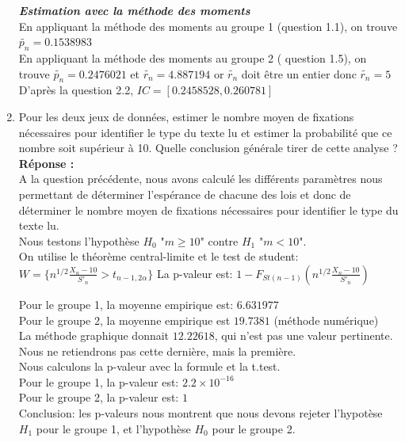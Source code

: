 \documentclass[12pt]{article}
\begin{document}
\begin{enumerate}
\textbf{\textit{Estimation avec la méthode des moments}}\\
En appliquant la méthode des moments au groupe 1 (question 1.1), on trouve $\tilde{p_n} = 0.1538983$ \\

\vspace{5mm}
En appliquant la méthode des moments au groupe 2 ( question 1.5), on trouve $\tilde{p_n} = 0.2476021 $  et $\tilde{r_n} = 4.887194$ or $\tilde{r_n}$ doit être un entier donc $\tilde{r_n} = 5$
D'après la question 2.2, $ IC = [0.2458528,0.260781]$


\item Pour les deux jeux de données, estimer le nombre moyen de fixations nécessaires pour identifier le type du texte lu et estimer la probabilité que ce nombre soit supérieur à 10. Quelle conclusion générale tirer de cette analyse ? \\
\textbf{Réponse :\\}
A la question précédente, nous avons calculé les différents paramètres nous permettant de déterminer l'espérance de chacune des lois et donc de déterminer le nombre moyen de fixations nécessaires pour identifier le type du texte lu. \\


Nous testons l'hypothèse $H_0$ "$m \geq 10$" contre $H_1$ "$m < 10$". \\
On utilise le théorème central-limite et le test de student:\\
$ W = \{n^{1/2} \frac{X_n - 10}{S'_n} > t_{n-1, 2\alpha}\}$
La p-valeur est: $1 - F_{St(n-1)}(n^{1/2} \frac{X_n - 10}{S'_n})$

Pour le groupe 1, la moyenne empirique est: $6.631977 $ \\
Pour le groupe 2, la moyenne empirique est $19.7381$ (méthode numérique) \\
La méthode graphique donnait $12.22618$, qui n'est pas une valeur pertinente. Nous ne retiendrons pas cette dernière, mais la première. \\

Nous calculons la p-valeur avec la formule et la t.test. \\
Pour le groupe 1, la p-valeur est: $2.2\times10^{-16}$ \\
Pour le groupe 2, la p-valeur est: $1$ \\

Conclusion: les p-valeurs nous montrent que nous devons rejeter l'hypotèse $H_1$ pour le groupe 1, et l'hypothèse $H_0$ pour le groupe 2.



\end{enumerate}
\end{document}
